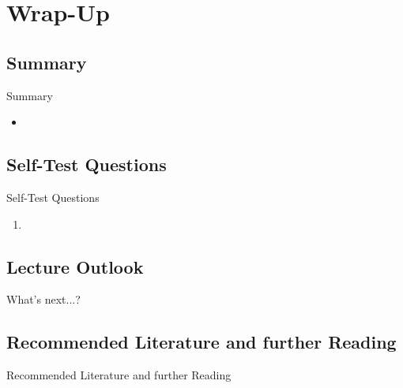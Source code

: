 \section{Wrap-Up}

\subsection{Summary}

\begin{frame}{Summary}{}
	\begin{itemize}
		\item 
	\end{itemize}
\end{frame}


\subsection{Self-Test Questions}

\begin{frame}{Self-Test Questions}{}\important
	\begin{enumerate}
		\item
	\end{enumerate}
\end{frame}


\subsection{Lecture Outlook}

\begin{frame}{What's next...?}{}
\end{frame}


\subsection{Recommended Literature and further Reading}

\begin{frame}{Recommended Literature and further Reading}{}
	\footnotesize
	\begin{thebibliography}{2}
	
	\end{thebibliography}
\end{frame}


\makethanks

